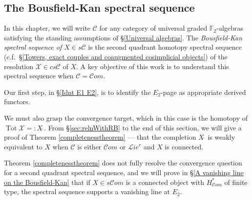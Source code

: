 \documentclass[11pt]{amsart} \renewcommand{\baselinestretch}{1.2}
\theoremstyle{plain}
\theoremstyle{definition}
\DeclareMathOperator{\Tot}{Tot}
\newcommand{\scrL}{\mathscr{L}}
\newcommand{\scrC}{\mathscr{C}}
\newcommand{\calC}{\mathcal{C}}
\newcommand{\calx}{\mathcal{X}}
\newcommand{\calc}{\mathcal{C}}
\newcommand{\F}{\mathbb{F}}
\newcommand{\algs}{{\scrC\!\textit{om}}}
\newcommand{\restliealgs}{{\scrL\!\textit{ie}^\textit{r}}}
\newcommand{\algcat}{{\calc}}%
\newcommand{\Ftwo}{\F_2}
\begin{document}
\begin{Bousfield-Kan spectral sequence}
\section{\textbf{The Bousfield-Kan spectral sequence}}
\label{Bousfield-Kan spectral sequence}

In this chapter, we will write $\algcat$ for any category of universal graded $\Ftwo $-algebras satisfying the standing assumptions of \S\ref{Universal algebras}. The \emph{Bousfield-Kan spectral sequence of $X\in s\algcat$} is the second quadrant homotopy spectral sequence (c.f.\ \S\ref{Towers, exact couples and coaugmented cosimplicial objects}) of the resolution $\calx\in cs\algcat$ of $X$.
A key objective of this work is to understand this spectral sequence when $\calc=\algs$.

Our first step, in \S\ref{Idnt E1 E2}, is to identify the $E_2$-page as appropriate derived functors.

We must also grasp the convergence target, which in this case is the homotopy of $\Tot \calx=:X\hat{\ }$. From \S\ref{sec:relnWithRB} to the end of this section, we will give a proof of Theorem \ref{completenesstheorem} --- that the completion $X\hat{\ } $ is weakly equivalent to $X$ when $\calC$ is either $\algs$ or $\restliealgs$ and $X$ is connected.

Theorem \ref{completenesstheorem} does not fully resolve the convergence question for a second quadrant spectral sequence, and we will prove in \S\ref{A vanishing line on the Bousfield-Kan} that if $X\in s\algs$ is a connected object with $H^*_\algs$ of finite type, the spectral sequence supports a vanishing line at $E_2$.





\end{Bousfield-Kan spectral sequence}
\end{document}
